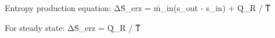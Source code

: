 Entropy production equation:  
ΔṠ_erz = ṁ_in(s_out - s_in) + Q̇_R / T̅  

For steady state:  
ΔṠ_erz = Q̇_R / T̅